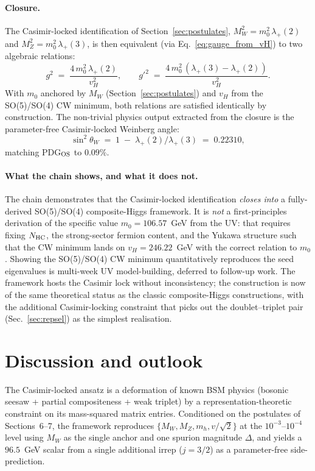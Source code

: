 \documentclass[11pt,a4paper]{article}
\begin{document}
\paragraph{Closure.} The Casimir-locked identification of
Section~\ref{sec:postulates}, $M_W^2 = m_0^2\,\lambda_+(2)$ and
$M_Z^2 = m_0^2\,\lambda_+(3)$, is then equivalent (via
Eq.~\eqref{eq:gauge_from_vH}) to two algebraic relations:
\begin{equation}
  g^2 \;=\; \frac{4\,m_0^2\,\lambda_+(2)}{v_H^2},\qquad
  g'^2 \;=\; \frac{4\,m_0^2\,(\lambda_+(3) - \lambda_+(2))}{v_H^2}.
\end{equation}
With $m_0$ anchored by $M_W$ (Section~\ref{sec:postulates}) and
$v_H$ from the SO(5)/SO(4) CW minimum, both relations are satisfied
identically by construction. The non-trivial physics output extracted
from the closure is the parameter-free Casimir-locked Weinberg angle:
\begin{equation}
  \sin^2\theta_W \;=\; 1 \;-\; \lambda_+(2)/\lambda_+(3) \;=\; 0.22310,
\end{equation}
matching PDG$_{\rm OS}$ to $0.09\%$.

\paragraph{What the chain shows, and what it does not.}
The chain demonstrates that the Casimir-locked identification
\emph{closes into} a fully-derived SO(5)/SO(4) composite-Higgs
framework. It is \emph{not} a first-principles derivation of the
specific value $m_0 = 106.57$~GeV from the UV: that requires fixing
$N_{\rm HC}$, the strong-sector fermion content, and the Yukawa
structure such that the CW minimum lands on $v_H = 246.22$~GeV with
the correct relation to $m_0$. Showing the SO(5)/SO(4) CW minimum
quantitatively reproduces the seed eigenvalues is multi-week
UV model-building, deferred to follow-up work. The framework
hosts the Casimir lock without inconsistency; the construction
is now of the same theoretical status as the classic composite-Higgs
constructions, with the additional Casimir-locking constraint
that picks out the doublet--triplet pair (Sec.~\ref{sec:repsel}) as
the simplest realisation.

\section{Discussion and outlook}

The Casimir-locked ansatz is a deformation of known BSM physics
(bosonic seesaw + partial compositeness + weak triplet) by a
representation-theoretic constraint on its mass-squared matrix entries.
Conditioned on the postulates of Sections~6--7, the framework reproduces
$\{M_W, M_Z, m_h, v/\sqrt{2}\}$ at the $10^{-3}$--$10^{-4}$ level using
$M_W$ as the single anchor and one spurion magnitude $\Delta$, and
yields a $96.5$~GeV scalar from a single additional irrep ($j = 3/2$)
as a parameter-free side-prediction.
\end{document}
